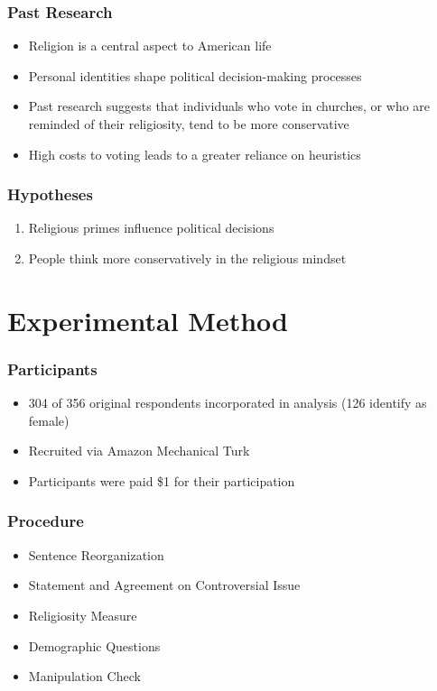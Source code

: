 \documentclass[14pt]{beamer}
\begin{document}
\begin{frame}
\frametitle{Past Research}
\begin{itemize}
	\item Religion is a central aspect to American life
	\item Personal identities shape political decision-making processes
	\item Past research suggests that individuals who vote in churches, or who are reminded of their religiosity, tend to be more conservative
	\item High costs to voting leads to a greater reliance on heuristics
\end{itemize}
\end{frame}

\begin{frame}
\frametitle{Hypotheses}
\begin{enumerate}
	\item Religious primes influence political decisions
	\item People think more conservatively in the religious mindset
\end{enumerate}
\end{frame}

\section{Experimental Method}

\begin{frame}
\frametitle{Participants}
\begin{itemize}
	\item 304 of 356 original respondents incorporated in analysis (126 identify as female)
	\item Recruited via Amazon Mechanical Turk
	\item Participants were paid \$1 for their participation
\end{itemize}
\end{frame}

\begin{frame}
\frametitle{Procedure}
\begin{itemize}
	\item Sentence Reorganization
	\item Statement and Agreement on Controversial Issue
	\item Religiosity Measure
	\item Demographic Questions
	\item Manipulation Check
\end{itemize}
\end{frame}
\end{document}
